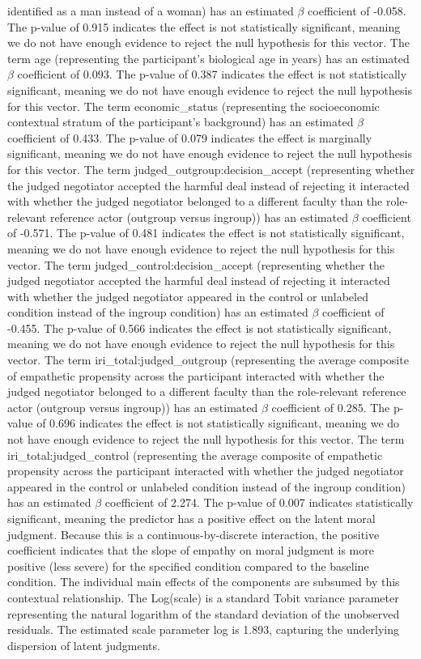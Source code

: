 \documentclass[11pt]{article}
\begin{document}
identified as a man instead of a woman) has an estimated $\beta$ coefficient of -0.058. The p-value of 0.915 indicates the effect is not statistically significant, meaning we do not have enough evidence to reject the null hypothesis for this vector. The term age (representing the participant's biological age in years) has an estimated $\beta$ coefficient of 0.093. The p-value of 0.387 indicates the effect is not statistically significant, meaning we do not have enough evidence to reject the null hypothesis for this vector. The term economic\_status (representing the socioeconomic contextual stratum of the participant's background) has an estimated $\beta$ coefficient of 0.433. The p-value of 0.079 indicates the effect is marginally significant, meaning we do not have enough evidence to reject the null hypothesis for this vector. The term judged\_outgroup:decision\_accept (representing whether the judged negotiator accepted the harmful deal instead of rejecting it interacted with whether the judged negotiator belonged to a different faculty than the role-relevant reference actor (outgroup versus ingroup)) has an estimated $\beta$ coefficient of -0.571. The p-value of 0.481 indicates the effect is not statistically significant, meaning we do not have enough evidence to reject the null hypothesis for this vector. The term judged\_control:decision\_accept (representing whether the judged negotiator accepted the harmful deal instead of rejecting it interacted with whether the judged negotiator appeared in the control or unlabeled condition instead of the ingroup condition) has an estimated $\beta$ coefficient of -0.455. The p-value of 0.566 indicates the effect is not statistically significant, meaning we do not have enough evidence to reject the null hypothesis for this vector. The term iri\_total:judged\_outgroup (representing the average composite of empathetic propensity across the participant interacted with whether the judged negotiator belonged to a different faculty than the role-relevant reference actor (outgroup versus ingroup)) has an estimated $\beta$ coefficient of 0.285. The p-value of 0.696 indicates the effect is not statistically significant, meaning we do not have enough evidence to reject the null hypothesis for this vector. The term iri\_total:judged\_control (representing the average composite of empathetic propensity across the participant interacted with whether the judged negotiator appeared in the control or unlabeled condition instead of the ingroup condition) has an estimated $\beta$ coefficient of 2.274. The p-value of 0.007 indicates statistically significant, meaning the predictor has a positive effect on the latent moral judgment. Because this is a continuous-by-discrete interaction, the positive coefficient indicates that the slope of empathy on moral judgment is more positive (less severe) for the specified condition compared to the baseline condition. The individual main effects of the components are subsumed by this contextual relationship. The Log(scale) is a standard Tobit variance parameter representing the natural logarithm of the standard deviation of the unobserved residuals. The estimated scale parameter log is 1.893, capturing the underlying dispersion of latent judgments.
\end{document}
